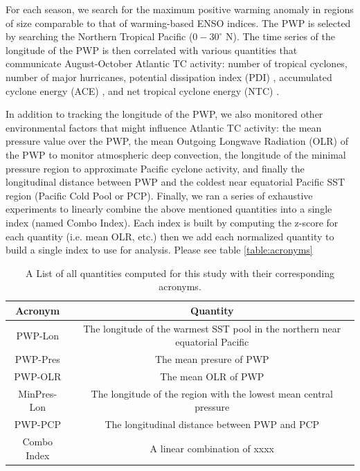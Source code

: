 \documentclass[]{article}
\begin{document}
For each season, we search for the maximum positive warming anomaly in regions of size comparable to that of warming-based ENSO indices. The PWP is selected by searching the Northern Tropical Pacific ($0-30^\circ$ N). The time series of the longitude of the PWP is then correlated with various quantities that communicate August-October Atlantic TC activity: number of tropical cyclones, number of major hurricanes, potential dissipation index (PDI) \cite{emanuel2005a}, accumulated cyclone energy (ACE) \cite{Bell2000}, and net tropical cyclone energy (NTC) \cite{goldenberg2001}.

In addition to tracking the longitude of the PWP, we also monitored other environmental factors that might influence Atlantic TC activity: the mean pressure value over the PWP, the mean Outgoing Longwave Radiation (OLR) of the PWP to monitor atmospheric deep convection, the longitude of the minimal pressure region to approximate Pacific cyclone activity, and finally the longitudinal distance between PWP and the coldest near equatorial Pacific SST region (Pacific Cold Pool or PCP). Finally, we ran a series of exhaustive experiments to linearly combine the above mentioned quantities into a single index (named Combo Index). Each index is built by computing the z-score for each quantity (i.e. mean OLR, etc.) then we add each normalized quantity to build a single index to use for analysis. Please see table \ref{table:acronyms}

\begin{table}
\hspace*{-1.5cm}
\begin{tabular}{cc}
\hline
Acronym & Quantity\\
\hline
PWP-Lon & The longitude of the warmest SST pool in the northern near equatorial Pacific\\
PWP-Pres & The mean presure of PWP\\
PWP-OLR &  The mean OLR of PWP \\
MinPres-Lon & The longitude of the region with the lowest mean central pressure\\
PWP-PCP & The longitudinal distance between PWP and PCP \\
Combo Index & A linear combination of xxxx \\
\hline
\end{tabular}
\caption{A List of all quantities computed for this study with their corresponding acronyms.}
\label{ref:acronyms}

\end{table}
\end{document}

